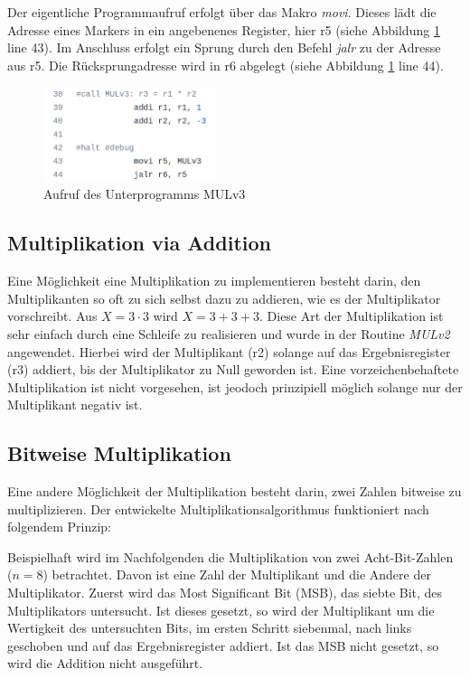 \documentclass[fleqn, a4paper, 11pt]{article}       %
\begin{document}
Der eigentliche Programmaufruf erfolgt über das Makro \emph{movi}. Dieses lädt die Adresse eines Markers in ein angebenenes Register, hier r5 (siehe Abbildung \ref{fig:FKT} line 43). Im Anschluss erfolgt ein Sprung durch den Befehl \emph{jalr} zu der Adresse aus r5. Die Rücksprungadresse wird in r6 abgelegt (siehe Abbildung \ref{fig:FKT} line 44).

\begin{figure}[h]
    \includegraphics[width =0.45\textwidth]{Funktionsaufruf.png}
\caption{Aufruf des Unterprogramms MULv3}
\label{fig:FKT}
\end{figure}


\subsection{Multiplikation via Addition}
Eine Möglichkeit eine Multiplikation zu implementieren besteht darin, den Multiplikanten so oft zu sich selbst dazu zu addieren, wie es der Multiplikator vorschreibt. Aus $X = 3 \cdot 3$ wird  $X = 3+3+3$. Diese Art der Multiplikation ist sehr einfach durch eine Schleife zu realisieren und wurde in der Routine \emph{MULv2} angewendet. Hierbei wird der Multiplikant (r2) solange auf das Ergebnisregister (r3) addiert, bis der Multiplikator zu Null geworden ist. Eine vorzeichenbehaftete Multiplikation ist nicht vorgesehen, ist jeodoch prinzipiell möglich solange nur der Multiplikant negativ ist. 

\subsection{Bitweise Multiplikation}
Eine andere Möglichkeit der Multiplikation besteht darin, zwei Zahlen bitweise zu multiplizieren. Der entwickelte Multiplikationsalgorithmus funktioniert nach folgendem Prinzip: 

Beispielhaft wird im Nachfolgenden die Multiplikation von zwei Acht-Bit-Zahlen \\ ($n = 8$) betrachtet. Davon ist eine Zahl der Multiplikant und die Andere der Multiplikator. Zuerst wird das Most Significant Bit (MSB), das siebte Bit, des Multiplikators untersucht. Ist dieses gesetzt, so wird der Multiplikant um die Wertigkeit des untersuchten Bits, im ersten Schritt siebenmal, nach links geschoben und auf das Ergebnisregister addiert. Ist das MSB nicht gesetzt, so wird die Addition nicht ausgeführt. \cite{MULv3}
\end{document}
